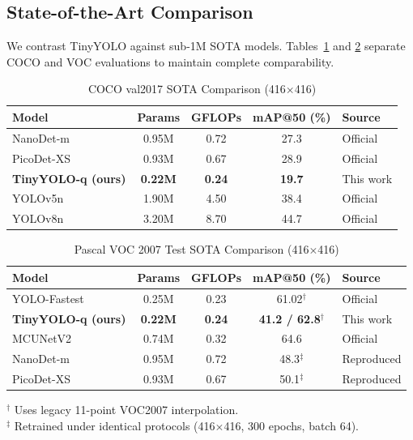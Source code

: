 \documentclass[conference]{IEEEtran}
\begin{document}
\subsection{State-of-the-Art Comparison}
We contrast TinyYOLO against sub-1M SOTA models. Tables~\ref{tab:sota_coco} and \ref{tab:sota_voc} separate COCO and VOC evaluations to maintain complete comparability.

\begin{table}[h]
\centering
\caption{COCO val2017 SOTA Comparison (416$\times$416)}
\label{tab:sota_coco}
\setlength{\tabcolsep}{4pt}
\begin{tabular}{lcccl}
\toprule
Model & Params & GFLOPs & mAP@50 (\%) & Source \\
\midrule
NanoDet-m \cite{lyu2020nanodet} & 0.95M & 0.72 & 27.3 & Official \\
PicoDet-XS \cite{yu2021picodet} & 0.93M & 0.67 & 28.9 & Official \\
\textbf{TinyYOLO-q (ours)} & \textbf{0.22M} & \textbf{0.24} & \textbf{19.7} & This work \\
YOLOv5n \cite{jocher2020yolov5} & 1.90M & 4.50 & 38.4 & Official \\
YOLOv8n \cite{jocher2023yolov8} & 3.20M & 8.70 & 44.7 & Official \\
\bottomrule
\end{tabular}
\end{table}

\begin{table}[h]
\centering
\caption{Pascal VOC 2007 Test SOTA Comparison (416$\times$416)}
\label{tab:sota_voc}
\setlength{\tabcolsep}{4pt}
\begin{tabular}{lcccl}
\toprule
Model & Params & GFLOPs & mAP@50 (\%) & Source \\
\midrule
YOLO-Fastest \cite{wu2021yolofastest} & 0.25M & 0.23 & 61.02$^\dagger$ & Official \\
\textbf{TinyYOLO-q (ours)} & \textbf{0.22M} & \textbf{0.24} & \textbf{41.2 / 62.8$^\dagger$} & This work \\
MCUNetV2 \cite{lin2021mcunetv2} & 0.74M & 0.32 & 64.6 & Official \\
NanoDet-m \cite{lyu2020nanodet} & 0.95M & 0.72 & 48.3$^\ddagger$ & Reproduced \\
PicoDet-XS \cite{yu2021picodet} & 0.93M & 0.67 & 50.1$^\ddagger$ & Reproduced \\
\bottomrule
\end{tabular}
\vskip 2pt
\begin{flushleft}
\scriptsize $^\dagger$ Uses legacy 11-point VOC2007 interpolation.\\
$^\ddagger$ Retrained under identical protocols (416$\times$416, 300 epochs, batch 64).
\end{flushleft}
\end{table}
\end{document}
